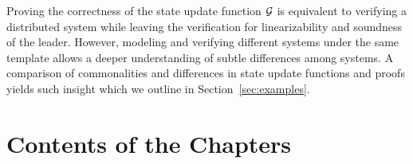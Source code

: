 {Proving the correctness of the state update function $\mathcal{G}$ is equivalent to
verifying a distributed system while leaving the verification for linearizability
and soundness of the leader. However, modeling and verifying different systems
under the same template allows a deeper understanding of subtle differences among systems.
A comparison of commonalities and differences in state update functions
and proofs yields such insight which we outline in Section~\ref{sec:examples}.



\section{Contents of the Chapters}
\label{chapter:introduction:sec:contents-of-the-chapters}




%
%
%
%
%
}